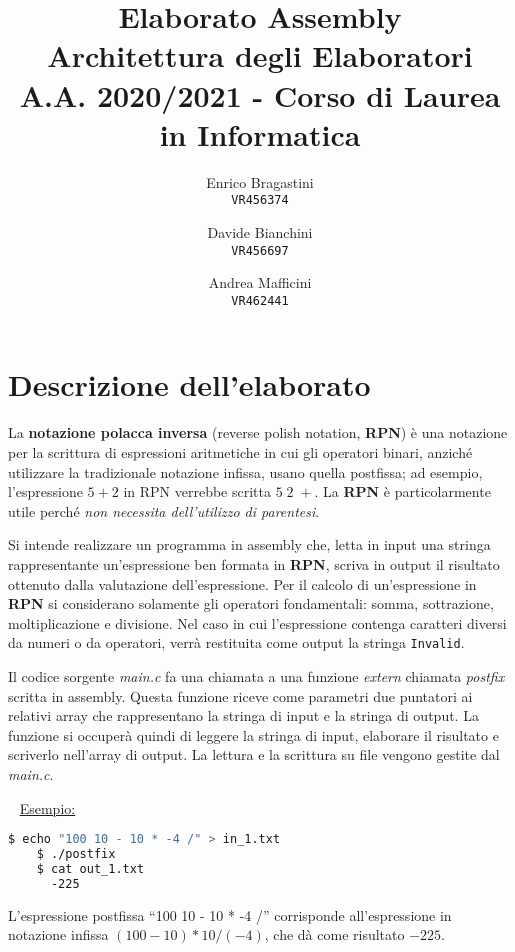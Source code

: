 \documentclass[a4paper,11pt,oneside]{book}
\title{
    \Large{\textbf{Elaborato Assembly}} \\
    Architettura degli Elaboratori      \\
    A.A. 2020/2021 - Corso di Laurea in Informatica
    }
\author{
  Enrico Bragastini\\
  \texttt{VR456374}
  \and
  Davide Bianchini \\
  \texttt{VR456697}
  \and
  Andrea Mafficini \\
  \texttt{VR462441}
}
\date{}
\begin{document}
\pagestyle{fancy}
\fancyhf{}
\rhead{}
\lhead{\nouppercase\leftmark}
\cfoot{\thepage}
\frontmatter

\maketitle
\tableofcontents

\mainmatter
\chapter{Descrizione dell'elaborato}
La \textbf{notazione polacca inversa} (reverse polish notation, \textbf{RPN}) è una notazione per la scrittura di espressioni aritmetiche in cui gli operatori binari, 
anziché utilizzare la tradizionale notazione infissa, usano quella postfissa; ad esempio, l’espressione $5 + 2$ in RPN verrebbe scritta $5 \; 2 \; +$. La \textbf{RPN} è 
particolarmente utile perché \emph{non necessita dell’utilizzo di parentesi}. 

Si intende realizzare un programma in assembly che, letta in input una stringa rappresentante un’espressione ben formata in \textbf{RPN}, scriva in output il risultato ottenuto dalla valutazione dell’espressione.
Per il calcolo di un'espressione in \textbf{RPN} si considerano solamente gli operatori fondamentali: somma, sottrazione, moltiplicazione e divisione.
Nel caso in cui l'espressione contenga caratteri diversi da numeri o da operatori, verrà restituita come output la stringa \verb|Invalid|.

Il codice sorgente \emph{main.c} fa una chiamata a una funzione \emph{extern} chiamata \emph{postfix} scritta in assembly. Questa funzione riceve come parametri due puntatori ai relativi array
che rappresentano la stringa di input e la stringa di output. La funzione si occuperà quindi di leggere la stringa di input, elaborare il risultato e scriverlo nell'array di output.
La lettura e la scrittura su file vengono gestite dal \emph{main.c}.

~\newline
\underline{Esempio:}
\begin{lstlisting}[language=Bash, showstringspaces=false]
    $ echo "100 10 - 10 * -4 /" > in_1.txt
    $ ./postfix
    $ cat out_1.txt 
      -225
\end{lstlisting}
L'espressione postfissa ``100 10 - 10 * -4 /'' corrisponde all'espressione in notazione infissa $(100-10) * 10 / (-4)$, che dà come risultato $-225$.
\end{document}
